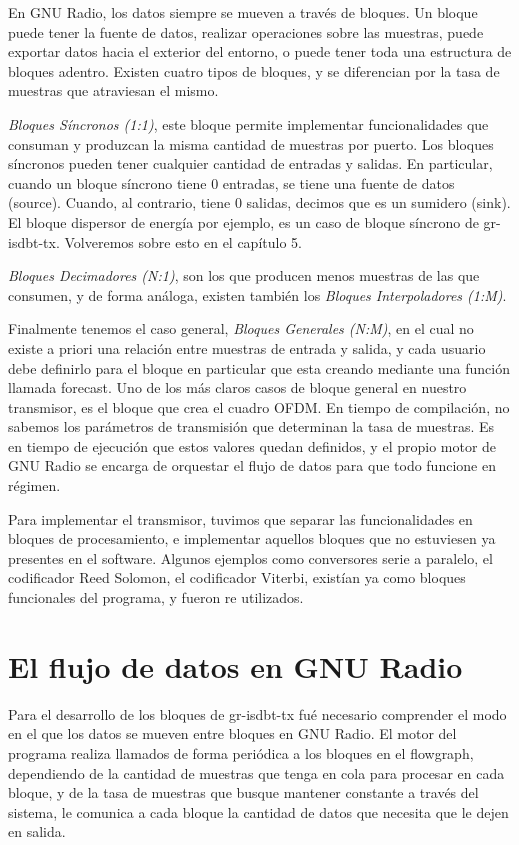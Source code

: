 En GNU Radio, los datos siempre se mueven a través de bloques. Un bloque puede tener la fuente de datos, realizar operaciones sobre las muestras, puede exportar datos hacia el exterior del entorno, o puede tener toda una estructura de bloques adentro. 
Existen cuatro tipos de bloques, y se diferencian por la tasa de muestras que atraviesan el mismo. 

\textit{Bloques Síncronos (1:1)}, este bloque permite implementar funcionalidades que consuman y produzcan la misma cantidad de muestras por puerto. Los bloques síncronos pueden tener cualquier cantidad de entradas y salidas. En particular, cuando un bloque síncrono tiene 0 entradas, se tiene una fuente de datos (source). Cuando, al contrario, tiene 0 salidas, decimos que es un sumidero (sink). El bloque dispersor de energía por ejemplo, es un caso de bloque síncrono de gr-isdbt-tx. Volveremos sobre esto en el capítulo 5.

\textit{Bloques Decimadores (N:1)}, son los que producen menos muestras de las que consumen, y de forma análoga, existen también los \textit{Bloques Interpoladores (1:M)}.

Finalmente tenemos el caso general, \textit{Bloques Generales (N:M)}, en el cual no existe a priori una relación entre muestras de entrada y salida, y cada usuario debe definirlo para el bloque en particular que esta creando mediante una función llamada forecast. Uno de los más claros casos de bloque general en nuestro transmisor, es el bloque que crea el cuadro OFDM. En tiempo de compilación, no sabemos los parámetros de transmisión que determinan la tasa de muestras. Es en tiempo de ejecución que estos valores quedan definidos, y el propio motor de GNU Radio se encarga de orquestar el flujo de datos para que todo funcione en régimen.

Para implementar el transmisor, tuvimos que separar las funcionalidades en bloques de procesamiento, e implementar aquellos bloques que no estuviesen ya presentes en el software. Algunos ejemplos como conversores serie a paralelo, el codificador Reed Solomon, el codificador Viterbi, existían ya como bloques funcionales del programa, y fueron re utilizados. 

\section{El flujo de datos en GNU Radio}

Para el desarrollo de los bloques de gr-isdbt-tx fué necesario comprender el modo en el que los datos se mueven entre bloques en GNU Radio. El motor del programa realiza llamados de forma periódica a los bloques en el flowgraph, dependiendo de la cantidad de muestras que tenga en cola para procesar en cada bloque, y de la tasa de muestras que busque mantener constante a través del sistema, le comunica a cada bloque la cantidad de datos que necesita que le dejen en salida.  

